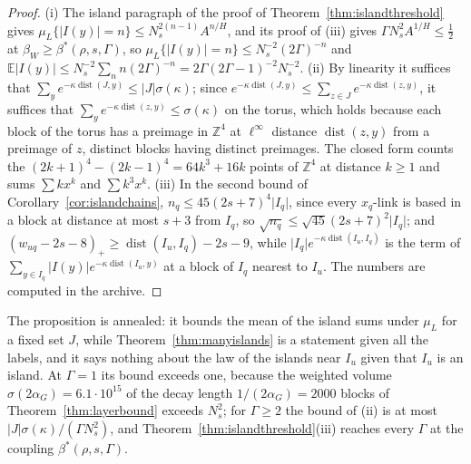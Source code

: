 \documentclass[11pt]{amsart}
\theoremstyle{definition}
\theoremstyle{remark}
\numberwithin{equation}{section}
\newcommand{\Z}{\mathbb{Z}}
\newcommand{\E}{\mathbb{E}}
\newcommand{\dist}{\operatorname{dist}}
\begin{document}
\begin{proof}
(i) The island paragraph of the proof of Theorem~\ref{thm:islandthreshold}
gives $\mu_L\{\lvert I(y)\rvert=n\}\le N_s^{2(n-1)}A^{n/H}$, and its proof
of (iii) gives $\varGamma N_s^2A^{1/H}\le\frac12$ at $\beta_W\ge\beta^*(\rho,
s,\varGamma)$, so $\mu_L\{\lvert I(y)\rvert=n\}\le N_s^{-2}(2\varGamma)^{-n}$
and $\E\lvert I(y)\rvert\le N_s^{-2}\sum_nn(2\varGamma)^{-n}=2\varGamma(2
\varGamma-1)^{-2}N_s^{-2}$. (ii) By linearity it suffices that
$\sum_ye^{-\kappa\dist(J,y)}\le\lvert J\rvert\sigma(\kappa)$; since
$e^{-\kappa\dist(J,y)}\le\sum_{z\in J}e^{-\kappa\dist(z,y)}$, it suffices
that $\sum_ye^{-\kappa\dist(z,y)}\le\sigma(\kappa)$ on the torus, which
holds because each block of the torus has a preimage in $\Z^4$ at
$\ell^\infty$ distance $\dist(z,y)$ from a preimage of $z$, distinct blocks
having distinct preimages. The closed form counts the $(2k+1)^4-(2k-1)^4=
64k^3+16k$ points of $\Z^4$ at distance $k\ge1$ and sums $\sum kx^k$ and
$\sum k^3x^k$. (iii) In the second bound of
Corollary~\ref{cor:islandchains}, $n_q\le45(2s+7)^4\lvert I_q\rvert$, since
every $x_q$-link is based in a block at distance at most $s+3$ from $I_q$,
so $\sqrt{n_q}\le\sqrt{45}(2s+7)^2\lvert I_q\rvert$; and $(w_{uq}-2s-8)_+
\ge\dist(I_u,I_q)-2s-9$, while $\lvert I_q\rvert e^{-\kappa\dist(I_u,I_q)}$
is the term of $\sum_{y\in I_q}\lvert I(y)\rvert e^{-\kappa\dist(I_u,y)}$ at
a block of $I_q$ nearest to $I_u$. The numbers are computed in the archive.
\end{proof}

The proposition is annealed: it bounds the mean of the island sums under
$\mu_L$ for a fixed set $J$, while Theorem~\ref{thm:manyislands} is a
statement given all the labels, and it says nothing about the law of the
islands near $I_u$ given that $I_u$ is an island. At $\varGamma=1$ its
bound exceeds one, because the weighted volume $\sigma(2\alpha_G)=6.1\cdot
10^{15}$ of the decay length $1/(2\alpha_G)=2000$ blocks of
Theorem~\ref{thm:layerbound} exceeds $N_s^2$; for $\varGamma\ge2$ the bound of (ii) is at most $\lvert J\rvert
\sigma(\kappa)/(\varGamma N_s^2)$, and Theorem~\ref{thm:islandthreshold}(iii)
reaches every $\varGamma$ at the coupling $\beta^*(\rho,s,\varGamma)$.
\end{document}
